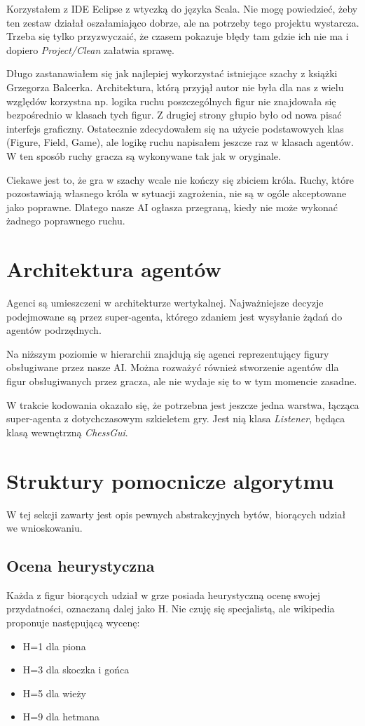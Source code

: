 \documentclass[a4paper,12pt,oneside,notitlepage,onecolumn]{article}
\begin{document}
Korzystałem z IDE Eclipse z wtyczką do języka Scala.
Nie mogę powiedzieć, żeby ten zestaw działał oszałamiająco dobrze, ale na potrzeby tego projektu wystarcza.
Trzeba się tylko przyzwyczaić, że czasem pokazuje błędy tam gdzie ich nie ma i dopiero \emph{Project/Clean} załatwia sprawę.

Długo zastanawiałem się jak najlepiej wykorzystać istniejące szachy z książki Grzegorza Balcerka.
Architektura, którą przyjął autor nie była dla nas z wielu względów korzystna np. logika ruchu poszczególnych figur nie znajdowała się bezpośrednio w klasach tych figur.
Z drugiej strony głupio było od nowa pisać interfejs graficzny.
Ostatecznie zdecydowałem się na użycie podstawowych klas (Figure, Field, Game), ale logikę ruchu napisałem jeszcze raz w klasach agentów.
W ten sposób ruchy gracza są wykonywane tak jak w oryginale.

Ciekawe jest to, że gra w szachy wcale nie kończy się zbiciem króla.
Ruchy, które pozostawiają własnego króla w sytuacji zagrożenia, nie są w ogóle akceptowane jako poprawne.
Dlatego nasze AI ogłasza przegraną, kiedy nie może wykonać żadnego poprawnego ruchu.

\section{Architektura agentów}
Agenci są umieszczeni w architekturze wertykalnej.
Najważniejsze decyzje podejmowane są przez super-agenta, którego zdaniem jest wysyłanie żądań do agentów podrzędnych.

Na niższym poziomie w hierarchii znajdują się agenci reprezentujący figury obsługiwane przez nasze AI.
Można rozważyć również stworzenie agentów dla figur obsługiwanych przez gracza, ale nie wydaje się to w tym momencie zasadne.

W trakcie kodowania okazało się, że potrzebna jest jeszcze jedna warstwa, łącząca super-agenta z dotychczasowym szkieletem gry.
Jest nią klasa \emph{Listener}, będąca klasą wewnętrzną \emph{ChessGui}.

\section{Struktury pomocnicze algorytmu}
W tej sekcji zawarty jest opis pewnych abstrakcyjnych bytów, biorących udział we wnioskowaniu.

\subsection{Ocena heurystyczna}
Każda z figur biorących udział w grze posiada heurystyczną ocenę swojej przydatności, oznaczaną dalej jako H.
Nie czuję się specjalistą, ale wikipedia proponuje następującą wycenę:
\begin{itemize}
 \item H=1 dla piona
 \item H=3 dla skoczka i gońca
 \item H=5 dla wieży
 \item H=9 dla hetmana
\end{itemize}
\end{document}
